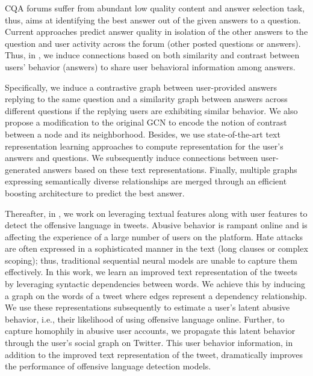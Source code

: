 CQA forums suffer from abundant low quality content and answer selection task, thus, aims at identifying the best answer out of the given answers to a question. Current approaches predict answer quality in isolation of the other answers to the question and user activity across the forum (other posted questions or answers).
Thus, in ,
we induce connections based on both similarity and contrast between users' behavior (answers) to share user behavioral information among answers.

Specifically, we induce a contrastive graph between user-provided answers replying to the same question and a similarity graph between answers across different questions if the replying users are exhibiting similar behavior. We also propose a modification to the original GCN to encode the notion of contrast between a node and its neighborhood.
Besides, we use state-of-the-art text representation learning approaches to compute representation for the user's answers and questions. We subsequently induce connections between user-generated answers based on these text representations.
Finally, multiple graphs expressing semantically diverse relationships are merged through an efficient boosting architecture to predict the best answer.

Thereafter, in , we work on
leveraging textual features along with user features
to detect the offensive language in tweets. Abusive behavior is rampant online and is affecting the experience of a large number of users on the platform. Hate attacks are often expressed in a sophisticated manner in the text (long clauses or complex scoping); thus, traditional sequential neural models are unable to capture them effectively.
In this work, we learn an improved text representation of the tweets
by leveraging syntactic dependencies between words.
We achieve this by inducing a graph on the words of a tweet where edges represent a dependency relationship. We use these representations subsequently to estimate a user's latent abusive behavior, i.e., their likelihood of using offensive language online.
Further, to capture homophily in abusive user accounts, we propagate this latent behavior through the user's social graph on Twitter. This user behavior information, in addition to the improved text representation of the tweet, dramatically improves the performance of offensive language detection models.

